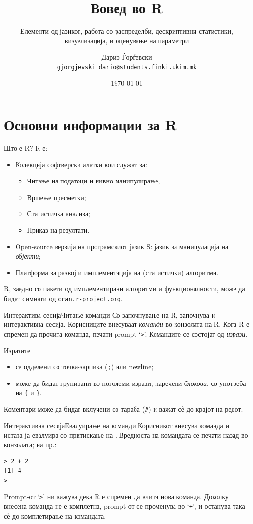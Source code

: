 \documentclass[hyperref={unicode}, xcolor={svgnames, table},
usepdftitle=false]{beamer}
\title{Вовед во R}
\subtitle{Елементи од јазикот, работа со распределби, дескриптивни статистики,
  визуелизација, и оценување на параметри}
\author[Дарио Ѓорѓевски]{%
  Дарио Ѓорѓевски\inst{1}\\%
  \href{mailto:gjorgjevski.dario@students.finki.ukim.mk}%
  {\texttt{gjorgjevski.dario@students.finki.ukim.mk}}
}
\institute[ФИНКИ]{%
  \inst{1}Факултет за компјутерски науки и инженерство\\%
  Универзитет Св.\ Кирил и Методиј, Скопје
}
\date{\today}
\theoremstyle{remark}
\begin{document}
\begin{frame}
  \titlepage
\end{frame}

\section{Основни информации за R}
\begin{frame}{Што е R?}
  R е:
  \begin{itemize}
  \item Колекција софтверски алатки кои служат за:
    \begin{itemize}
    \item Читање на податоци и нивно манипулирање;
    \item Вршење пресметки;
    \item Статистичка анализа;
    \item Приказ на резултати.
    \end{itemize}
  \item Open-source верзија на програмскиот јазик S: јазик за манипулација на
    \emph{објекти};
  \item Платформа за развој и имплементација на (статистички) алгоритми.
  \end{itemize}

  R, заедно со пакети од имплементирани алгоритми и функционалности, може да
  бидат симнати од
  \href{https://cran.r-project.org/}{\texttt{cran.r-project.org}}.
\end{frame}

\begin{frame}{Интерактива сесија}{Читање команди}
  Со започнување на R, започнува и интерактивна сесија.  Корисниците внесуваат
  \emph{команди} во конзолата на R.  Кога R е спремен да прочита команда, печати
  prompt `\texttt{>}'.  Командите се состојат од \emph{изрази}.

  Изразите
  \begin{itemize}
  \item се одделени со точка-зарпика (\texttt{;}) или newline;
  \item може да бидат групирани во поголеми изрази, наречени \emph{блокови}, со
    употреба на \texttt{\{} и \texttt{\}}.
  \end{itemize}

  Коментари може да бидат вклучени со тараба (\texttt{\#}) и важат сѐ до крајот
  на редот.
\end{frame}

\begin{frame}[fragile]{Интерактивна сесија}{Евалуирање на команди}
  Корисникот внесува команда и истата ја евалуира со притискање на
  \keys{\return}.  Вредноста на командата се печати назад во конзолата; на пр.:
\begin{verbatim}
> 2 + 2
[1] 4
>
\end{verbatim}

  Prompt-от `\texttt{>}' ни кажува дека R е спремен да вчита нова команда.
  Доколку внесена команда не е комплетна, prompt-от се променува во
  `\texttt{+}', и останува така сѐ до комплетирање на командата.
\end{frame}
\end{document}
